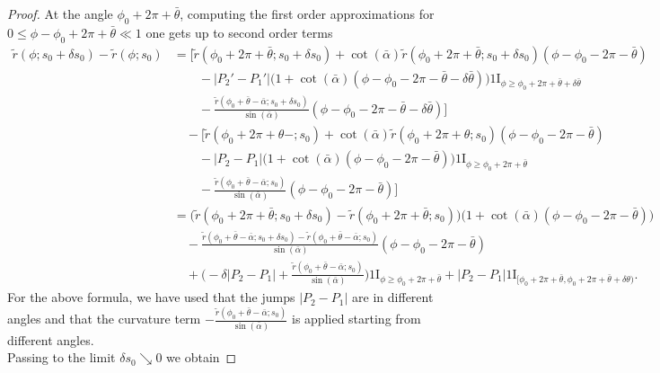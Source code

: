 \documentclass[10pt,a4paper]{amsart}
\newcommand{\ind}{1\!\!\mathrm{I}}
\begin{document}
\begin{proof}
At the angle $\phi_0 + 2\pi + \bar \theta$, computing the first order approximations for $0 \leq \phi - \phi_0 + 2\pi + \bar \theta \ll 1$ one gets up to second order terms
\begin{align*}
\tilde r(\phi;s_0 + \delta s_0) - \tilde r(\phi;s_0) &= \bigg[ \tilde r(\phi_0 + 2\pi + \bar\theta; s_0 + \delta s_0) + \cot(\bar \alpha) \tilde r(\phi_0 + 2\pi + \bar\theta;s_0 + \delta s_0) (\phi - \phi_0 - 2\pi - \bar \theta) \\
& \quad \quad - |P_2' - P_1'| \big( 1 + \cot(\bar \alpha) (\phi - \phi_0 - 2\pi - \bar \theta - \delta \bar \theta) \big) \ind_{\phi \geq \phi_0 + 2\pi + \bar \theta + \delta \bar \theta} \\
& \quad \quad - \frac{\tilde r(\phi_0 + \bar \theta - \bar \alpha;s_0 + \delta s_0)}{\sin(\bar \alpha)} (\phi - \phi_0 - 2\pi - \bar \theta - \delta \bar \theta) \bigg] \\
& \quad - \bigg[ \tilde r(\phi_0 + 2\pi + \theta-;s_0) + \cot(\bar \alpha) \tilde r(\phi_0 + 2\pi +\theta;s_0) (\phi - \phi_0 - 2\pi - \bar \theta) \\
& \quad \quad - |P_2 - P_1| \big( 1 + \cot(\bar \alpha) (\phi - \phi_0 - 2\pi - \bar \theta) \big) \ind_{\phi \geq \phi_0 + 2\pi + \bar \theta}  \\
& \quad \quad - \frac{\tilde r(\phi_0 + \bar \theta - \bar \alpha;s_0)}{\sin(\bar \alpha)} (\phi - \phi_0 - 2\pi - \bar \theta) \bigg] \\
&= \big( \tilde r(\phi_0 + 2\pi + \bar\theta;s_0 + \delta s_0) - \tilde r(\phi_0 + 2\pi + \bar\theta;s_0) \big) \big( 1 + \cot(\bar \alpha) (\phi - \phi_0 - 2\pi - \bar \theta) \big) \\
& \quad - \frac{\tilde r(\phi_0 + \bar \theta - \bar \alpha;s_0 + \delta s_0) - \tilde r(\phi_0 + \bar \theta - \bar \alpha;s_0)}{\sin(\bar \alpha)} (\phi - \phi_0 - 2\pi - \bar \theta) \\
& \quad + \bigg( - \delta |P_2 - P_1| + \frac{\tilde r(\phi_0 + \bar \theta - \bar \alpha;s_0)}{\sin(\bar \alpha)} \bigg) \ind_{\phi \geq \phi_0 + 2\pi + \bar \theta} + |P_2 - P_1| \ind_{[\phi_0 + 2\pi + \bar \theta,\phi_0 + 2\pi + \bar \theta + \delta \theta)}.
\end{align*}
For the above formula, we have used that the jumps $|P_2 - P_1|$ are in different angles and that the curvature term $- \frac{\tilde r(\phi_0+\bar \theta -\bar \alpha;s_0)}{\sin(\bar \alpha)}$ is applied starting from different angles. \\
Passing to the limit $\delta s_0 \searrow 0$ we obtain

\end{proof}
\end{document}

